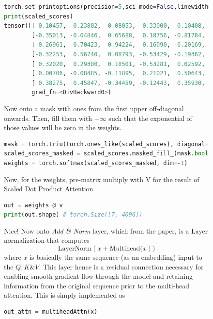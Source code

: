 \documentclass[12pt]{article}
\begin{document}
\begin{figure}[!htb]
    \begin{minipage}[t]{0.65\textwidth}    
\begin{lstlisting}[language=python,style=python,basicstyle=\ttfamily\tiny]
torch.set_printoptions(precision=5,sci_mode=False,linewidth=500)
print(scaled_scores)
tensor([[-0.10457, -0.23802,  0.08053,  0.33000, -0.10408,  0.55068,  0.68916],
        [-0.35013, -0.04846,  0.65688,  0.18756, -0.81784,  0.10682, -0.74313],
        [-0.26961, -0.70423,  0.94224,  0.16090, -0.20169,  0.15549, -0.28134],
        [-0.32253,  0.56740,  0.08793, -0.53429, -0.19362, -0.22245, -0.38808],
        [ 0.32020,  0.29380,  0.18501, -0.53281,  0.02592, -0.57664,  0.17737],
        [ 0.00706, -0.08485, -0.11895,  0.21021,  0.50643,  0.48187,  0.11625],
        [ 0.38275,  0.45847, -0.34459, -0.12443,  0.35930,  0.65530,  0.03805]], 
        grad_fn=<DivBackward0>)
\end{lstlisting}
Now onto a mask with ones from the first upper off-diagonal onwards. Then, fill them with {\small $-\infty$}
such that the exponential of those values will be zero in the weights. 
\begin{lstlisting}[language=python,style=python,basicstyle=\ttfamily\footnotesize]
mask = torch.triu(torch.ones_like(scaled_scores), diagonal=1)
scaled_scores_masked = scaled_scores.masked_fill_(mask.bool(), -torch.inf)
weights = torch.softmax(scaled_scores_masked, dim=-1)
\end{lstlisting}
Now, for the weights, pre-matrix multiply with {\small V} for the result of Scaled Dot Product Attention
\begin{lstlisting}[language=python,style=python,basicstyle=\ttfamily\footnotesize]
out = weights @ v 
print(out.shape) # torch.Size([7, 4096])
\end{lstlisting}
Nice! Now onto {\it Add \& Norm} layer, which from the paper, is a Layer normalization that computes\\
\vspace{-1.5em}
$$\text{LayerNorm}(x  + \text{Multihead(}x))$$
where $x$ is basically the same sequence (as an embedding) input to the $Q, K \& V$. This layer hence
is a residual connection necessary for enabling smooth gradient flow through the model and retaining 
information from the original sequence prior to the multi-head attention. This is simply implemented as 
\begin{lstlisting}[language=python,style=python,basicstyle=\ttfamily\footnotesize]
out_attn = multiheadAttn(x)

\end{lstlisting}
\end{minipage}
\end{figure}
\end{document}
